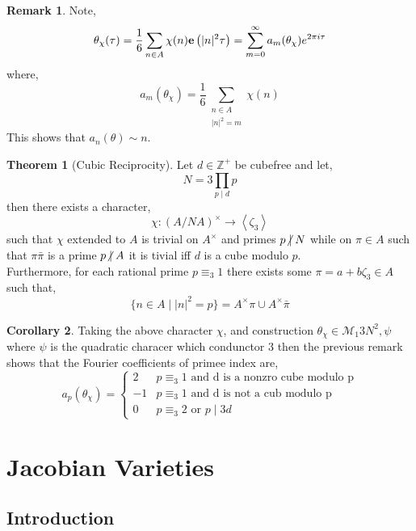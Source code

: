 \documentclass{article}
\newcommand{\divides}{\mid}
\newcommand{\ndivides}{\centernot \mid}
\newcommand{\Zplus}{\mathbb{Z}^{+}}
\theoremstyle{definition}
\newtheorem{theorem}{Theorem}[section]
\newtheorem{corollary}[theorem]{Corollary}
\newtheorem{remark}{Remark}[section]
\newcommand{\M}[1]{\mathcal{M}_{#1}}
\begin{document}
\begin{remark}
Note,
\[ \theta_\chi(\tau) = \frac{1}{6} \sum_{n \in A} \chi(n) \mathbf{e}\left( |n|^2 \tau \right) = \sum_{m = 0}^\infty a_m(\theta_\chi) e^{2 \pi i \tau} \]
where,
\[ a_m(\theta_\chi) = \frac{1}{6} \sum_{\substack{n \in A \\ |n|^2 = m}} \chi(n) \]
This shows that $a_n(\theta) \sim n$. 
\end{remark}

\begin{theorem}[Cubic Reciprocity]
Let $d \in \Zplus$ be cubefree and let,
\[ N = 3 \prod_{p \divides d} p \]
then there exists a character,
\[ \chi : (A / NA)^\times \to \left< \zeta_3 \right> \]
such that $\chi$ extended to $A$ is trivial on $A^\times$ and primes $p \ndivides N$ while on $\pi \in A$ such that $\pi \bar{\pi}$ is a prime $p \ndivides A$ it is tivial iff $d$ is a cube modulo $p$. 
\bigskip\\
Furthermore, for each rational prime $p \equiv_3 1$ there exists some $\pi = a + b \zeta_3 \in A$ such that,
\[ \{ n \in A \mid |n|^2 = p \} = A^\times \pi \cup A^\times \bar{\pi} \]
\end{theorem}

\begin{corollary}
Taking the above character $\chi$, and construction $\theta_\chi \in \M{1}{3 N^2, \psi}$ where $\psi$ is the quadratic characer which condunctor $3$ then the previous remark shows that the Fourier coefficients of primee index are,
\[ a_p(\theta_\chi) = 
\begin{cases}
2 & p \equiv_3 1 \text{ and d is a nonzro cube modulo p} 
\\
- 1 & p \equiv_3 1 \text{ and d is not a cub modulo p} 
\\
0 & p \equiv_3 2 \text{ or } p \divides 3 d 
\end{cases} \]
\end{corollary}

\section{Jacobian Varieties}
\newcommand{\Jac}[1]{\mathrm{Jac}(#1)}

\subsection{Introduction}
\end{document}
